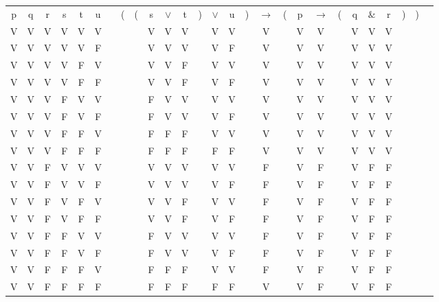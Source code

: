 \documentclass[a4paper,10pt]{article}
\begin{document}
\begin{enumerate}
\begin{center}
\begin{longtable}{@{ }c@{ }@{ }c@{ }@{ }c@{ }@{ }c@{ }@{ }c@{ }@{ }c c@{ }@{}c@{}@{}c@{}@{ }c@{ }@{ }c@{ }@{ }c@{ }@{}c@{}@{ }c@{ }@{ }c@{ }@{}c@{}@{ }c@{ }@{}c@{}@{ }c@{ }@{ }c@{ }@{}c@{}@{ }c@{ }@{ }c@{ }@{ }c@{ }@{}c@{}@{}c@{}@{ }c}
p & q & r & s & t & u &  & ( & ( & s & $\lor$ & t & ) & $\lor$ & u & ) & $\rightarrow$ & ( & p & $\rightarrow$ & ( & q & $\&$ & r & ) & ) & \\
V & V & V & V & V & V &  &  &  & V & V & V &  & V & V &  & V &  & V & V &  & V & V & V &  &  & \\
V & V & V & V & V & F &  &  &  & V & V & V &  & V & F &  & V &  & V & V &  & V & V & V &  &  & \\
V & V & V & V & F & V &  &  &  & V & V & F &  & V & V &  & V &  & V & V &  & V & V & V &  &  & \\
V & V & V & V & F & F &  &  &  & V & V & F &  & V & F &  & V &  & V & V &  & V & V & V &  &  & \\
V & V & V & F & V & V &  &  &  & F & V & V &  & V & V &  & V &  & V & V &  & V & V & V &  &  & \\
V & V & V & F & V & F &  &  &  & F & V & V &  & V & F &  & V &  & V & V &  & V & V & V &  &  & \\
V & V & V & F & F & V &  &  &  & F & F & F &  & V & V &  & V &  & V & V &  & V & V & V &  &  & \\
V & V & V & F & F & F &  &  &  & F & F & F &  & F & F &  & V &  & V & V &  & V & V & V &  &  & \\
V & V & F & V & V & V &  &  &  & V & V & V &  & V & V &  & F &  & V & F &  & V & F & F &  &  & \\
V & V & F & V & V & F &  &  &  & V & V & V &  & V & F &  & F &  & V & F &  & V & F & F &  &  & \\
V & V & F & V & F & V &  &  &  & V & V & F &  & V & V &  & F &  & V & F &  & V & F & F &  &  & \\
V & V & F & V & F & F &  &  &  & V & V & F &  & V & F &  & F &  & V & F &  & V & F & F &  &  & \\
V & V & F & F & V & V &  &  &  & F & V & V &  & V & V &  & F &  & V & F &  & V & F & F &  &  & \\
V & V & F & F & V & F &  &  &  & F & V & V &  & V & F &  & F &  & V & F &  & V & F & F &  &  & \\
V & V & F & F & F & V &  &  &  & F & F & F &  & V & V &  & F &  & V & F &  & V & F & F &  &  & \\
V & V & F & F & F & F &  &  &  & F & F & F &  & F & F &  & V &  & V & F &  & V & F & F &  &  & \\

\end{longtable}
\end{center}
\end{enumerate}
\end{document}
